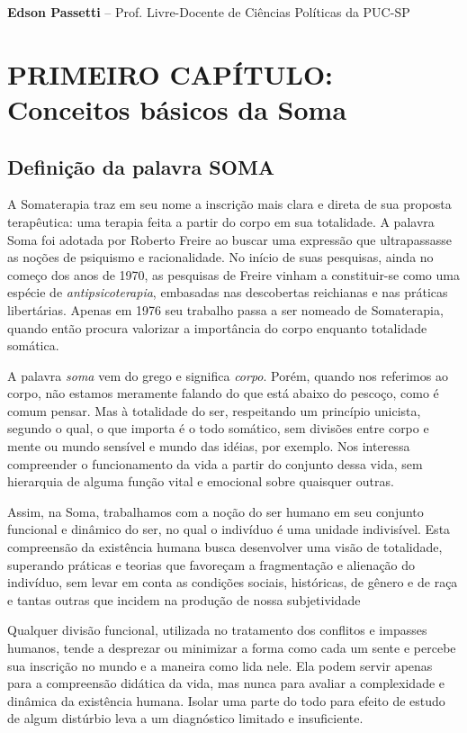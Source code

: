 \textbf{Edson Passetti} -- Prof. Livre-Docente de Ciências Políticas da
PUC-SP

\chapter{PRIMEIRO CAPÍTULO: Conceitos básicos da Soma}

\section{Definição da palavra SOMA}

A Somaterapia traz em seu nome a inscrição mais clara e direta de sua
proposta terapêutica: uma terapia feita a partir do corpo em sua
totalidade. A palavra Soma foi adotada por Roberto Freire ao buscar uma
expressão que ultrapassasse as noções de psiquismo e racionalidade. No
início de suas pesquisas, ainda no começo dos anos de 1970, as pesquisas
de Freire vinham a constituir-se como uma espécie de
\emph{antipsicoterapia}, embasadas nas descobertas reichianas e nas
práticas libertárias. Apenas em 1976 seu trabalho passa a ser nomeado de
Somaterapia, quando então procura valorizar a importância do corpo
enquanto totalidade somática.

A palavra \emph{soma} vem do grego e significa \emph{corpo}. Porém,
quando nos referimos ao corpo, não estamos meramente falando do que está
abaixo do pescoço, como é comum pensar. Mas à totalidade do ser,
respeitando um princípio unicista, segundo o qual, o que importa é o
todo somático, sem divisões entre corpo e mente ou mundo sensível e
mundo das idéias, por exemplo. Nos interessa compreender o funcionamento
da vida a partir do conjunto dessa vida, sem hierarquia de alguma função
vital e emocional sobre quaisquer outras.

Assim, na Soma, trabalhamos com a noção do ser humano em seu conjunto
funcional e dinâmico do ser, no qual o indivíduo é uma unidade
indivisível. Esta compreensão da existência humana busca desenvolver uma
visão de totalidade, superando práticas e teorias que favoreçam a
fragmentação e alienação do indivíduo, sem levar em conta as condições
sociais, históricas, de gênero e de raça e tantas outras que incidem na
produção de nossa subjetividade

Qualquer divisão funcional, utilizada no tratamento dos conflitos e
impasses humanos, tende a desprezar ou minimizar a forma como cada um
sente e percebe sua inscrição no mundo e a maneira como lida nele. Ela
podem servir apenas para a compreensão didática da vida, mas nunca para
avaliar a complexidade e dinâmica da existência humana. Isolar uma parte
do todo para efeito de estudo de algum distúrbio leva a um diagnóstico
limitado e insuficiente.

